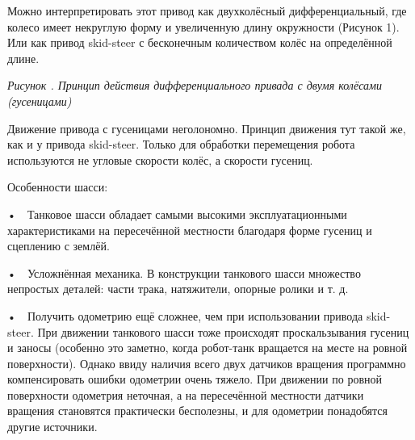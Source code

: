\documentclass[a4paper]{article}
\newcounter{qwerty}
\renewcommand\theqwerty{\arabic{qwerty}}
\begin{document}
Можно интерпретировать этот привод как двухколёсный дифференциальный, где колесо имеет некруглую форму и увеличенную
длину окружности (Рисунок 1). Или как привод skid-steer с бесконечным количеством колёс на определённой длине.


{\centering\itshape\color[HTML]{44546A}
\label{bkm:Ref127517653}Рисунок \stepcounter{qwerty}{\theqwerty}. Принцип действия дифференциального привада с двумя
колёсами (гусеницами)
\par}

Движение привода с гусеницами неголономно. Принцип движения тут такой же, как и у привода skid-steer. Только для
обработки перемещения робота используются не угловые скорости колёс, а скорости гусениц.

Особенности шасси:

•\ \ Танковое шасси обладает самыми высокими эксплуатационными характеристиками на пересечённой местности благодаря
форме гусениц и сцеплению с землёй.

•\ \ Усложнённая механика. В конструкции танкового шасси множество непростых деталей: части трака, натяжители, опорные
ролики и т. д.

•\ \ Получить одометрию ещё сложнее, чем при использовании привода skid-steer. При движении танкового шасси тоже
происходят проскальзывания гусениц и заносы (особенно это заметно, когда робот-танк вращается на месте на ровной
поверхности). Однако ввиду наличия всего двух датчиков вращения программно компенсировать ошибки одометрии очень
тяжело. При движении по ровной поверхности одометрия неточная, а на пересечённой местности датчики вращения становятся
практически бесполезны, и для одометрии понадобятся другие источники.
\end{document}
